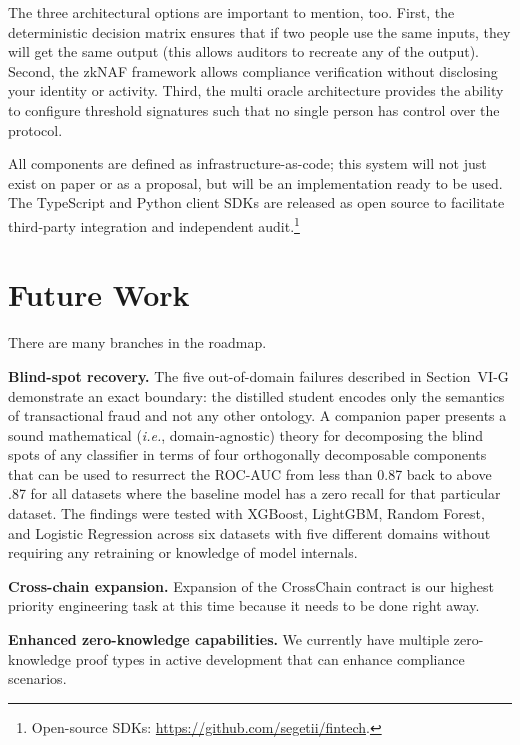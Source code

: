 \documentclass[journal]{IEEEtran}
\newcommand{\ie}{\textit{i.e.}}
\begin{document}
The three architectural options are important to mention, too. First, the deterministic decision matrix ensures that if two people use the same inputs, they will get the same output (this allows auditors to recreate any of the output). Second, the zkNAF framework allows compliance verification without disclosing your identity or activity. Third, the multi oracle architecture provides the ability to configure threshold signatures such that no single person has control over the protocol.

All components are defined as infrastructure-as-code; this system will not just exist on paper or as a proposal, but will be an implementation ready to be used. The TypeScript and Python client SDKs are released as open source to facilitate third-party integration and independent audit.\footnote{Open-source SDKs: \url{https://github.com/segetii/fintech}.}

\section{Future Work}
\label{sec:future}

There are many branches in the roadmap.

\textbf{Blind-spot recovery.} The five out-of-domain failures described in Section~VI-G demonstrate an exact boundary: the distilled student encodes only the semantics of transactional fraud and not any other ontology. A companion paper presents a sound mathematical (\ie, domain-agnostic) theory for decomposing the blind spots of any classifier in terms of four orthogonally decomposable components that can be used to resurrect the ROC-AUC from less than 0.87 back to above .87 for all datasets where the baseline model has a zero recall for that particular dataset. The findings were tested with XGBoost, LightGBM, Random Forest, and Logistic Regression across six datasets with five different domains without requiring any retraining or knowledge of model internals.

\textbf{Cross-chain expansion.} Expansion of the CrossChain contract is our highest priority engineering task at this time because it needs to be done right away.

\textbf{Enhanced zero-knowledge capabilities.} We currently have multiple zero-knowledge proof types in active development that can enhance compliance scenarios.
\end{document}
